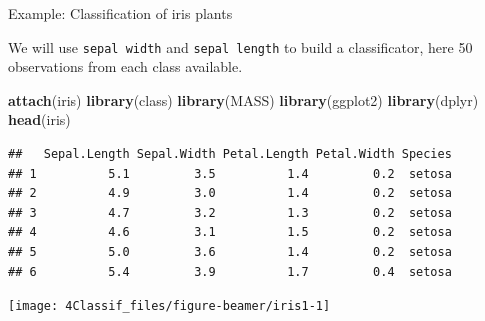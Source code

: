 \documentclass[10pt,ignorenonframetext,]{beamer}
\newenvironment{Shaded}{\begin{snugshade}}{\end{snugshade}}
\newcommand{\KeywordTok}[1]{\textcolor[rgb]{0.13,0.29,0.53}{\textbf{#1}}}
\newcommand{\NormalTok}[1]{#1}
\begin{document}
\begin{frame}[fragile]

\begin{block}{Example: Classification of iris plants}

\vspace{2mm}

We will use \texttt{sepal\ width} and \texttt{sepal\ length} to build a
classificator, here 50 observations from each class available.

\scriptsize

\begin{Shaded}
\begin{Highlighting}[]
\KeywordTok{attach}\NormalTok{(iris)}
\KeywordTok{library}\NormalTok{(class)}
\KeywordTok{library}\NormalTok{(MASS)}
\KeywordTok{library}\NormalTok{(ggplot2)}
\KeywordTok{library}\NormalTok{(dplyr)}
\KeywordTok{head}\NormalTok{(iris)}
\end{Highlighting}
\end{Shaded}

\begin{verbatim}
##   Sepal.Length Sepal.Width Petal.Length Petal.Width Species
## 1          5.1         3.5          1.4         0.2  setosa
## 2          4.9         3.0          1.4         0.2  setosa
## 3          4.7         3.2          1.3         0.2  setosa
## 4          4.6         3.1          1.5         0.2  setosa
## 5          5.0         3.6          1.4         0.2  setosa
## 6          5.4         3.9          1.7         0.4  setosa
\end{verbatim}

\end{block}

\end{frame}

\begin{frame}

\begin{center}\texttt{[image: 4Classif\_files/figure-beamer/iris1-1]} \end{center}

\end{frame}
\end{document}
